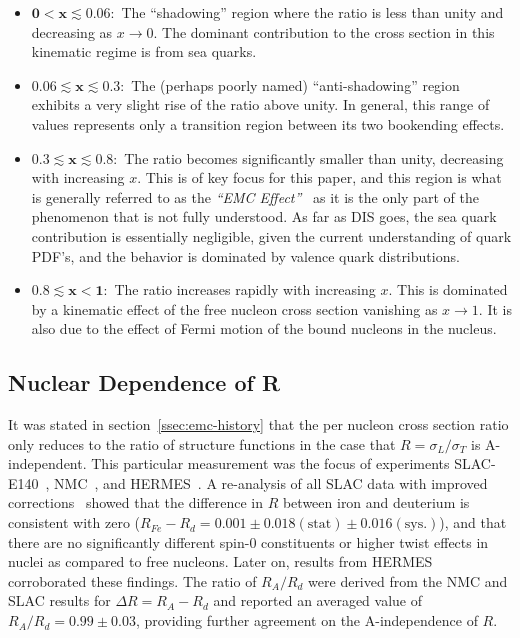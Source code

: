 \begin{itemize}
	\item $\mathbf{0<x\lesssim0.06:}$ The ``shadowing'' region where the ratio is less than unity and decreasing as $x\rightarrow0$. The dominant contribution to the cross section in this kinematic regime is from sea quarks.
	\item $\mathbf{0.06\lesssim x \lesssim 0.3:}$ The (perhaps poorly named) ``anti-shadowing'' region exhibits a very slight rise of the ratio above unity. In general, this range of values represents only a transition region between its two bookending effects.
	\item $\mathbf{0.3\lesssim x \lesssim 0.8:}$ The ratio becomes significantly smaller than unity, decreasing with increasing $x$. This is of key focus for this paper, and this region is what is generally referred to as the \emph{``EMC Effect''}~\cite{Geesaman:1995yd} as it is the only part of the phenomenon that is not fully understood.  As far as DIS goes, the sea quark contribution is essentially negligible, given the current understanding of quark PDF's, and the behavior is dominated by valence quark distributions.
	\item $\mathbf{0.8\lesssim x < 1:}$ The ratio increases rapidly with increasing $x$. This is dominated by a kinematic effect of the free nucleon cross section vanishing as $x\rightarrow1$. It is also due to the effect of Fermi motion of the bound nucleons in the nucleus.
\end{itemize}

\subsection{Nuclear Dependence of R}

It was stated in section~\ref{ssec:emc-history} that the per nucleon cross section ratio only reduces to the ratio of structure functions in the case that $R=\sigma_L/\sigma_T$ is A-independent. This particular measurement was the focus of experiments SLAC-E140~\cite{PhysRevLett.61.1061, Dasu:1993vk}, NMC~\cite{Arneodo:1996qe}, and HERMES~\cite{Ackerstaff:1999ac}. A re-analysis of all SLAC data with improved corrections~\cite{Dasu:1993vk} showed that the difference in $R$ between iron and deuterium is consistent with zero ($R_{Fe}-R_d = 0.001 \pm 0.018 (\text{stat}) \pm 0.016 (\text{sys.})$), and that there are no significantly different spin-0 constituents or higher twist effects in nuclei as compared to free nucleons. Later on, results from HERMES corroborated these findings. The ratio of $R_A/R_d$ were derived from the NMC and SLAC results for $\Delta R = R_A - R_d$ and reported an averaged value of $R_A/R_d = 0.99 \pm 0.03$, providing further agreement on the A-independence of $R$.

